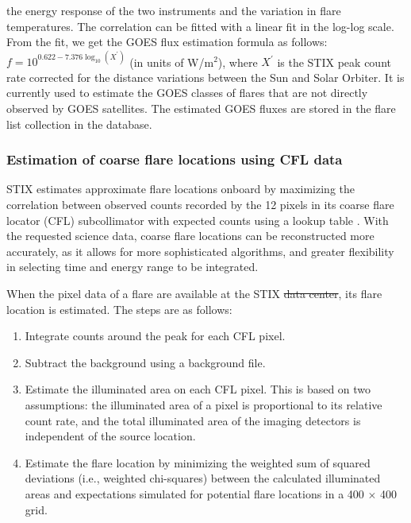\documentclass[referee]{aa} %
\providecommand{\DIFaddtex}[1]{{\protect\color{blue}\uwave{#1}}} %
\providecommand{\DIFdeltex}[1]{{\protect\color{red}\sout{#1}}}                      %
\providecommand{\DIFaddbegin}{} %
\providecommand{\DIFaddend}{} %
\providecommand{\DIFdelbegin}{} %
\providecommand{\DIFdelend}{} %
\providecommand{\DIFadd}[1]{\texorpdfstring{\DIFaddtex{#1}}{#1}} %
\providecommand{\DIFdel}[1]{\texorpdfstring{\DIFdeltex{#1}}{}} %
\newcommand{\DIFscaledelfig}{0.5}
\newlength{\DIFdelgraphicswidth} %
\newlength{\DIFdelgraphicsheight} %
\newcommand{\DIFaddincludegraphics}[2][]{{\color{blue}\fbox{\DIFOincludegraphics[#1]{#2}}}} %
\newcommand{\DIFdelincludegraphics}[2][]{%
\sbox{\DIFdelgraphicsbox}{\DIFOincludegraphics[#1]{#2}}%
\settoboxwidth{\DIFdelgraphicswidth}{\DIFdelgraphicsbox} %
\settoboxtotalheight{\DIFdelgraphicsheight}{\DIFdelgraphicsbox} %
\scalebox{\DIFscaledelfig}{%
\parbox[b]{\DIFdelgraphicswidth}{\usebox{\DIFdelgraphicsbox}\\[-\baselineskip] \rule{\DIFdelgraphicswidth}{0em}}\llap{\resizebox{\DIFdelgraphicswidth}{\DIFdelgraphicsheight}{%
\setlength{\unitlength}{\DIFdelgraphicswidth}%
\begin{picture}(1,1)%
\thicklines\linethickness{2pt} %
{\color[rgb]{1,0,0}\put(0,0){\framebox(1,1){}}}%
{\color[rgb]{1,0,0}\put(0,0){\line( 1,1){1}}}%
{\color[rgb]{1,0,0}\put(0,1){\line(1,-1){1}}}%
\end{picture}%
}\hspace*{3pt}}} %
} %
\DeclareRobustCommand{\DIFaddbegin}{\DIFOaddbegin \let\includegraphics\DIFaddincludegraphics} %
\DeclareRobustCommand{\DIFaddend}{\DIFOaddend \let\includegraphics\DIFOincludegraphics} %
\DeclareRobustCommand{\DIFdelbegin}{\DIFOdelbegin \let\includegraphics\DIFdelincludegraphics} %
\DeclareRobustCommand{\DIFdelend}{\DIFOaddend \let\includegraphics\DIFOincludegraphics} %
\begin{document}
the energy response of the two instruments and the variation in flare temperatures. 
The correlation can be fitted with a linear fit in the log-log scale. 
From the fit, we get the GOES flux estimation formula as follows: 
\DIFdelbegin \DIFdel{$f = 10^{0.622 -7.376 \log_{10} (X^{'})}$ }\DIFdelend \DIFaddbegin \DIFadd{$f = 10^{-7.376+0.622 \log_{10} (X^{'})}$ }\DIFaddend (in units of W/m$^2$), where $X^{'}$ is the STIX peak count rate corrected for the distance variations between the Sun and Solar Orbiter. It is currently used to estimate the GOES classes of flares that are not directly observed by GOES satellites.  The estimated GOES fluxes are stored in the flare list collection in the database. 

\subsubsection{Estimation of coarse flare locations using CFL data}
STIX estimates approximate flare locations onboard by 
maximizing the correlation between observed counts recorded by the 12 pixels in its coarse flare locator (CFL) subcollimator with expected counts using a lookup table \citep{stix2020}. 
With the requested science data, coarse flare locations can be reconstructed more accurately, as it allows for more sophisticated algorithms, and greater flexibility in selecting time and energy range to be integrated. 

When the pixel data of a flare are available at the STIX \DIFdelbegin \DIFdel{data center}\DIFdelend \DIFaddbegin \DIFadd{Data Center}\DIFaddend , its flare location is estimated. 
The steps are as follows:
\begin{enumerate}
    \item Integrate counts around the peak for each CFL pixel.
    \item Subtract the background using a background file.
    \item Estimate the illuminated area on each CFL pixel.  This is based on two assumptions:  the illuminated area of a pixel is proportional to its relative count rate, and the total illuminated area of the imaging detectors is independent of the source location.
    \item Estimate the flare location by minimizing the weighted sum of squared deviations (i.e., weighted chi-squares) between the calculated illuminated areas and expectations simulated for potential flare locations in a 400 $\times$ 400 grid.
\end{enumerate}
\end{document}
